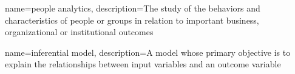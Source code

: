 \usepackage{booktabs}
\usepackage{longtable}
\usepackage{graphicx}
\usepackage{hyperref}
\usepackage[bf,singlelinecheck=off]{caption}
\usepackage[scale=.8]{sourcecodepro}
\usepackage[bottom]{footmisc}

\usepackage{framed,color}

\renewcommand{\textfraction}{0.05}
\renewcommand{\topfraction}{0.8}
\renewcommand{\bottomfraction}{0.8}
\renewcommand{\floatpagefraction}{0.75}

\renewenvironment{quote}{\begin{VF}}{\end{VF}}
\let\oldhref\href
\renewcommand{\href}[2]{#2\footnote{\url{#1}}}

\makeatletter
\newenvironment{kframe}{%
\medskip{}
\setlength{\fboxsep}{.8em}
 \def\at@end@of@kframe{}%
 \ifinner\ifhmode%
  \def\at@end@of@kframe{\end{minipage}}%
  \begin{minipage}{\columnwidth}%
 \fi\fi%
 \def\FrameCommand##1{\hskip\@totalleftmargin \hskip-\fboxsep
 \colorbox{shadecolor}{##1}\hskip-\fboxsep
     \hskip-\linewidth \hskip-\@totalleftmargin \hskip\columnwidth}%
 \MakeFramed {\advance\hsize-\width
   \@totalleftmargin\z@ \linewidth\hsize
   \@setminipage}}%
 {\par\unskip\endMakeFramed%
 \at@end@of@kframe}
\makeatother

\renewenvironment{Shaded}{\begin{kframe}}{\end{kframe}}

\usepackage{makeidx}
\makeindex


\usepackage{amsthm}
\makeatletter
\def\thm@space@setup{%
  \thm@preskip=8pt plus 2pt minus 4pt
  \thm@postskip=\thm@preskip
}
\makeatother

\usepackage{listings}
\usepackage[nonumberlist]{glossaries}
\makenoidxglossaries

{
    name={people analytics},
    description={The study of the behaviors and characteristics of people or groups in relation to important business, organizational or institutional outcomes}
}

{
    name={inferential model},
    description={A model whose primary objective is to explain the relationships between input variables and an outcome variable}
}

